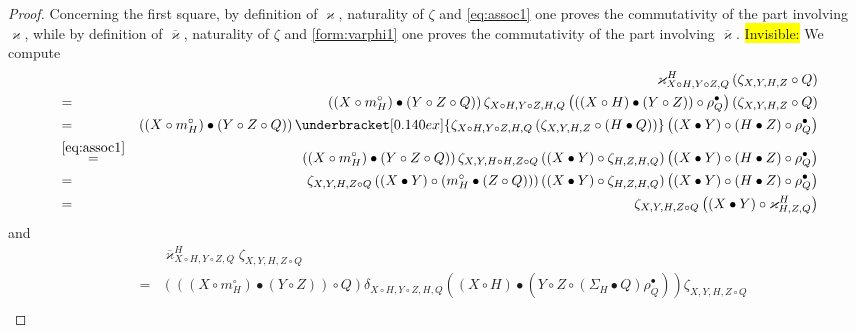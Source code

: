 \documentclass[nosumlimits,twoside]{amsart}
\theoremstyle{definition}
\theoremstyle{remark}
\newenvironment{invisible}{{\noindent\sc \colorbox{yellow}{Invisible:}\;}\color{gray}}{\medskip}
\begin{document}
\begin{proof}
Concerning the first square, by definition of $\varkappa$, naturality of $\zeta$ and \eqref{eq:assoc1} one proves the commutativity of the part involving $\varkappa$, while by definition of $\overline{\varkappa }$, naturality of $\zeta$ and \eqref{form:varphi1} one proves the commutativity of the part involving $\overline{\varkappa }$.
\begin{invisible}
We compute%
\begin{eqnarray*}
&&\varkappa _{X\circ H,Y\circ Z,Q}^{H}\left( \zeta _{X,Y,H,Z}\circ Q\right)\\
&=&\left( \left( X\circ m_{H}^{\circ }\right) \bullet \left( Y\circ Z\circ
Q\right) \right) \zeta _{X\circ H,Y\circ Z,H,Q}\left( \left( \left( X\circ
H\right) \bullet \left( Y\circ Z\right) \right) \circ \rho _{Q}^{\bullet
}\right) \left( \zeta _{X,Y,H,Z}\circ Q\right)  \\
&=&\left( \left( X\circ m_{H}^{\circ }\right) \bullet \left( Y\circ Z\circ
Q\right) \right) \underbracket[0.140ex]{\zeta _{X\circ H,Y\circ Z,H,Q}\left( \zeta
_{X,Y,H,Z}\circ \left( H\bullet Q\right) \right) }\left( \left( X\bullet
Y\right) \circ \left( H\bullet Z\right) \circ \rho _{Q}^{\bullet }\right)  \\
&\overset{\eqref{eq:assoc1}}=&\left( \left( X\circ m_{H}^{\circ }\right) \bullet \left( Y\circ Z\circ
Q\right) \right) \zeta _{X,Y,H\circ H,Z\circ Q}\left( \left( X\bullet
Y\right) \circ \zeta _{H,Z,H,Q}\right) \left( \left( X\bullet Y\right) \circ
\left( H\bullet Z\right) \circ \rho _{Q}^{\bullet }\right)  \\
&=&\zeta _{X,Y,H,Z\circ Q}\left( \left( X\bullet Y\right) \circ \left(
m_{H}^{\circ }\bullet \left( Z\circ Q\right) \right) \right) \left( \left(
X\bullet Y\right) \circ \zeta _{H,Z,H,Q}\right) \left( \left( X\bullet
Y\right) \circ \left( H\bullet Z\right) \circ \rho _{Q}^{\bullet }\right)  \\
&=&\zeta _{X,Y,H,Z\circ Q}\left( \left( X\bullet Y\right) \circ \varkappa
_{H,Z,Q}^{H}\right)
\end{eqnarray*}%
and%
\begin{eqnarray*}
&&\overline{\varkappa }_{X\circ H,Y\circ Z,Q}^{H}\zeta _{X,Y,H,Z\circ Q}\\
&=&\left( \left( \left( X\circ m_{H}^{\circ }\right) \bullet \left( Y\circ
Z\right) \right) \circ Q\right) \delta _{X\circ H,Y\circ Z,H,Q}\left( \left(
X\circ H\right) \bullet \left( Y\circ Z\circ \left( \Sigma _{H}\bullet
Q\right) \rho _{Q}^{\bullet }\right) \right) \zeta _{X,Y,H,Z\circ Q} \\

\end{eqnarray*}
\end{invisible}
\end{proof}
\end{document}
